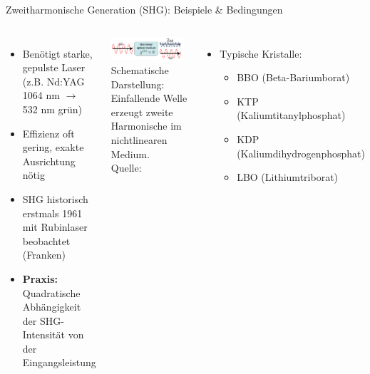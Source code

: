 \documentclass[aspectratio=169]{beamer} %
\newcommand{\figcite}[1]{\\[-3mm]{\tiny Quelle: \cite{#1}}}
\begin{document}
\begin{frame}{Zweitharmonische Generation (SHG): Beispiele \& Bedingungen}
  \begin{columns}[T,onlytextwidth]
      \begin{itemize}
        \item Benötigt starke, gepulste Laser (z.B. Nd:YAG 1064 nm $\rightarrow$ 532 nm grün)
        \item Effizienz oft gering, exakte Ausrichtung nötig
        \item SHG historisch erstmals 1961 mit Rubinlaser beobachtet (Franken)
        \item \textbf{Praxis:} Quadratische Abhängigkeit der SHG-Intensität von der Eingangsleistung
      \end{itemize}
      \includegraphics[width=0.95\textwidth]{Images/Schematic_of_the_SHG_conversion_of_an_excited_wave_in_a_non-linear_medium.png}\\
      {\tiny Schematische Darstellung: Einfallende Welle erzeugt zweite Harmonische im nichtlinearen Medium. \figcite{BPAegirsson2017}}
      \begin{itemize}
        \item Typische Kristalle: 
          \begin{itemize}
            \item BBO (Beta-Bariumborat)
            \item KTP (Kaliumtitanylphosphat)
            \item KDP (Kaliumdihydrogenphosphat)
            \item LBO (Lithiumtriborat)
          \end{itemize}
      \end{itemize}
  \end{columns}
\end{frame}
\end{document}
